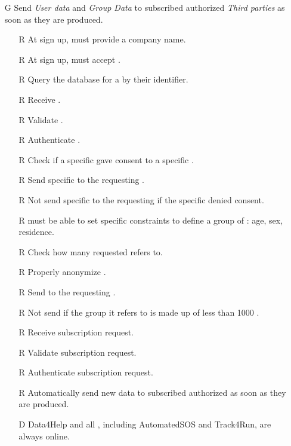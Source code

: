 \documentclass[../../../rasd.tex]{subfiles}
\begin{document}
\begin{itemize}
	\item[G\subs{4}]Send \textit{User data} and \textit{Group Data} to subscribed authorized \textit{Third parties} as soon as they are produced.
	\begin{itemize}
		\item[R\subs{3}]At sign up,  must provide a company name.
		\item[R\subs{5}]At sign up,  must accept .
		\item[R\subs{7}]Query the database for a  by their identifier.
		\item[R\subs{8}]Receive .
		\item[R\subs{9}]Validate .
		\item[R\subs{10}]Authenticate .
		\item[R\subs{18}]Check if a specific  gave consent to a specific .
		\item[R\subs{19}]Send specific to the requesting .
		\item[R\subs{20}]Not send specific to the requesting  if the specific  denied consent.
		\item[R\subs{21}] must be able to set specific constraints to define a group of : age, sex, residence.
		\item[R\subs{22}]Check how many  requested  refers to.
		\item[R\subs{23}]Properly anonymize .
		\item[R\subs{24}]Send  to the requesting .
		\item[R\subs{25}]Not send  if the group it refers to is made up of less than 1000 .
		\item[R\subs{26}]Receive  subscription request.
		\item[R\subs{27}]Validate  subscription request.
		\item[R\subs{28}]Authenticate  subscription request.
		\item[R\subs{29}]Automatically send new data to subscribed authorized  as soon as they are produced.
		\\
		\item[D\subs{9}]Data4Help and all , including AutomatedSOS and Track4Run, are always online.

\end{itemize}
\end{itemize}
\end{document}
